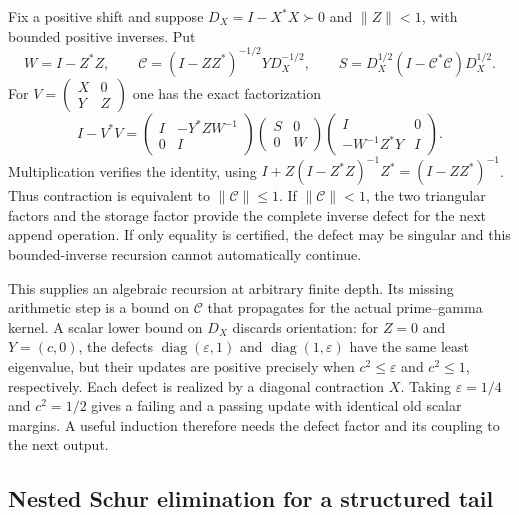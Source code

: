 \documentclass[11pt]{article}
\numberwithin{equation}{section}
\theoremstyle{definition}
\theoremstyle{remark}
\newcommand{\norm}[1]{\lVert#1\rVert}
\begin{document}
Fix a positive shift and suppose $D_X=I-X^*X\succ0$ and $\norm Z<1$,
with bounded positive inverses. Put
\[
 W=I-Z^*Z,\qquad
 \mathcal C=(I-ZZ^*)^{-1/2}YD_X^{-1/2},\qquad
 S=D_X^{1/2}(I-\mathcal C^*\mathcal C)D_X^{1/2}.
\]
For $V=\left(\begin{smallmatrix}X&0\\Y&Z\end{smallmatrix}\right)$ one has
the exact factorization
\begin{equation}\label{eq:storage-factor}
 I-V^*V=
 \begin{pmatrix}I&-Y^*ZW^{-1}\\0&I\end{pmatrix}
 \begin{pmatrix}S&0\\0&W\end{pmatrix}
 \begin{pmatrix}I&0\\-W^{-1}Z^*Y&I\end{pmatrix}.
\end{equation}
Multiplication verifies the identity, using
$I+Z(I-Z^*Z)^{-1}Z^*=(I-ZZ^*)^{-1}$.
Thus contraction is equivalent to $\norm{\mathcal C}\le1$.
If $\norm{\mathcal C}<1$, the two triangular factors and the storage
factor provide the complete inverse defect for the next append operation.
If only equality is certified, the defect may be singular and this
bounded-inverse recursion cannot automatically continue.

This supplies an algebraic recursion at arbitrary finite depth. Its missing
arithmetic step is a bound on $\mathcal C$ that propagates for the actual
prime--gamma kernel. A scalar lower bound on $D_X$ discards orientation:
for $Z=0$ and $Y=(c,0)$, the defects
$\operatorname{diag}(\varepsilon,1)$ and
$\operatorname{diag}(1,\varepsilon)$ have the same least eigenvalue, but
their updates are positive precisely when $c^2\le\varepsilon$ and
$c^2\le1$, respectively. Each defect is realized by a diagonal contraction
$X$. Taking $\varepsilon=1/4$ and $c^2=1/2$ gives a failing and a passing
update with identical old scalar margins. A useful induction therefore
needs the defect factor and its coupling to the next output.

\subsection{Nested Schur elimination for a structured tail}
\end{document}
